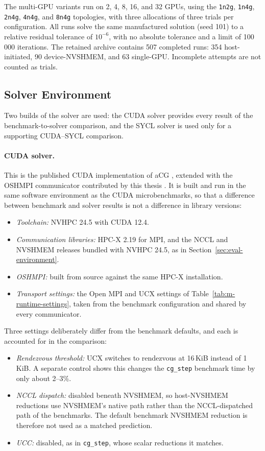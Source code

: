 The multi-GPU variants run on 2, 4, 8, 16, and 32 GPUs, using the \texttt{1n2g}, \texttt{1n4g}, \texttt{2n4g}, \texttt{4n4g}, and \texttt{8n4g} topologies, with three allocations of three trials per configuration. All runs solve the same manufactured solution (seed 101) to a relative residual tolerance of $10^{-6}$, with no absolute tolerance and a limit of 100\,000 iterations. The retained archive contains 507 completed runs: 354 host-initiated, 90 device-NVSHMEM, and 63 single-GPU. Incomplete attempts are not counted as trials.

\subsection{Solver Environment}\label{sec:acg-environment}

Two builds of the solver are used: the CUDA solver provides every result of the benchmark-to-solver comparison, and the SYCL solver is used only for a supporting CUDA--SYCL comparison.

\paragraph{CUDA solver.} This is the published CUDA implementation of aCG \cite{trotter_cpu-_2025}, extended with the OSHMPI communicator contributed by this thesis \cite{merenda_acg_oshmpi_2026}. It is built and run in the same software environment as the CUDA microbenchmarks, so that a difference between benchmark and solver results is not a difference in library versions:
\begin{itemize}
    \item \emph{Toolchain:} NVHPC 24.5 with CUDA 12.4.
    \item \emph{Communication libraries:} HPC-X 2.19 for MPI, and the NCCL and NVSHMEM releases bundled with NVHPC 24.5, as in Section~\ref{sec:eval-environment}.
    \item \emph{OSHMPI:} built from source against the same HPC-X installation.
    \item \emph{Transport settings:} the Open MPI and UCX settings of Table~\ref{tab:m-runtime-settings}, taken from the benchmark configuration and shared by every communicator.
\end{itemize}
Three settings deliberately differ from the benchmark defaults, and each is accounted for in the comparison:
\begin{itemize}
    \item \emph{Rendezvous threshold:} UCX switches to rendezvous at 16\,KiB instead of 1\,KiB. A separate control shows this changes the \texttt{cg\_step} benchmark time by only about 2--3\%.
    \item \emph{NCCL dispatch:} disabled beneath NVSHMEM, so host-NVSHMEM reductions use NVSHMEM's native path rather than the NCCL-dispatched path of the benchmarks. The default benchmark NVSHMEM reduction is therefore not used as a matched prediction.
    \item \emph{UCC:} disabled, as in \texttt{cg\_step}, whose scalar reductions it matches.
\end{itemize}

